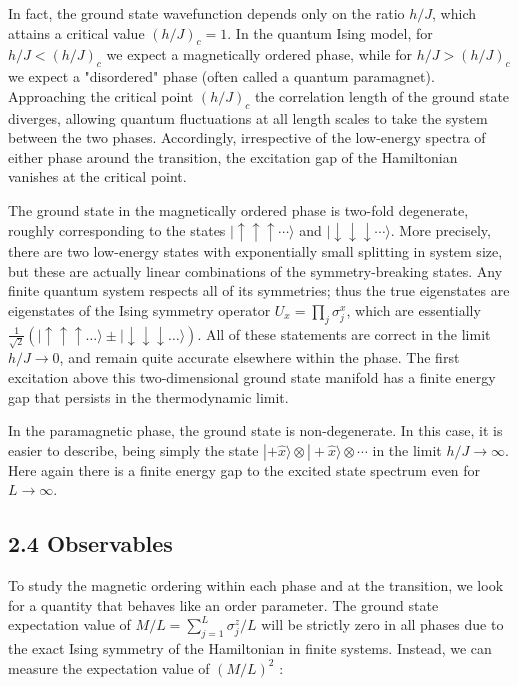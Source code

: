 \documentclass[10pt]{article}
\begin{document}
In fact, the ground state wavefunction depends only on the ratio $h / J$, which attains a critical value $(h / J)_{c}=1$. In the quantum Ising model, for $h / J<(h / J)_{c}$ we expect a magnetically ordered phase, while for $h / J>(h / J)_{c}$ we expect a "disordered" phase (often called a quantum paramagnet). Approaching the critical point $(h / J)_{c}$ the correlation length of the ground state diverges, allowing quantum fluctuations at all length scales to take the system between the two phases. Accordingly, irrespective of the low-energy spectra of either phase around the transition, the excitation gap of the Hamiltonian vanishes at the critical point.

The ground state in the magnetically ordered phase is two-fold degenerate, roughly corresponding to the states $|\uparrow \uparrow \uparrow \cdots\rangle$ and $|\downarrow \downarrow \downarrow \cdots\rangle$. More precisely, there are two low-energy states with exponentially small splitting in system size, but these are actually linear combinations of the symmetry-breaking states. Any finite quantum system respects all of its symmetries; thus the true eigenstates are eigenstates of the Ising symmetry operator $U_{x}=\prod_{j} \sigma_{j}^{x}$, which are essentially $\frac{1}{\sqrt{2}}(|\uparrow \uparrow \uparrow \ldots\rangle \pm|\downarrow \downarrow \downarrow \ldots\rangle)$. All of these statements are correct in the limit $h / J \rightarrow 0$, and remain quite accurate elsewhere within the phase. The first excitation above this two-dimensional ground state manifold has a finite energy gap that persists in the thermodynamic limit.

In the paramagnetic phase, the ground state is non-degenerate. In this case, it is easier to describe, being simply the state $|+\hat{x}\rangle \otimes|+\hat{x}\rangle \otimes \cdots$ in the limit $h / J \rightarrow \infty$. Here again there is a finite energy gap to the excited state spectrum even for $L \rightarrow \infty$.

\subsection*{2.4 Observables}
To study the magnetic ordering within each phase and at the transition, we look for a quantity that behaves like an order parameter. The ground state expectation value of $M / L=\sum_{j=1}^{L} \sigma_{j}^{z} / L$ will be strictly zero in all phases due to the exact Ising symmetry of the Hamiltonian in finite systems. Instead, we can measure the expectation value of $(M / L)^{2}$ :
\end{document}
